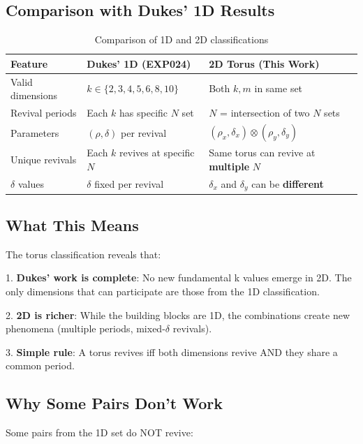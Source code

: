 \documentclass[12pt]{article}
\begin{document}
\subsection{Comparison with Dukes' 1D Results}

\begin{table}[h!]
\centering
\caption{Comparison of 1D and 2D classifications}
\label{tab:comparison}
\begin{tabular}{p{4cm}p{5cm}p{5cm}}
\toprule
\textbf{Feature} & \textbf{Dukes' 1D (EXP024)} & \textbf{2D Torus (This Work)} \\
\midrule
Valid dimensions & \(k \in \{2,3,4,5,6,8,10\}\) & Both \(k,m\) in same set \\
Revival periods & Each \(k\) has specific \(N\) set & \(N\) = intersection of two \(N\) sets \\
Parameters & \((\rho, \delta)\) per revival & \((\rho_x,\delta_x) \otimes (\rho_y,\delta_y)\) \\
Unique revivals & Each \(k\) revives at specific \(N\) & Same torus can revive at \textbf{multiple} \(N\) \\
\(\delta\) values & \(\delta\) fixed per revival & \(\delta_x\) and \(\delta_y\) can be \textbf{different} \\
\bottomrule
\end{tabular}
\end{table}

\subsection{What This Means}

The torus classification reveals that:

1. \textbf{Dukes' work is complete}: No new fundamental k values emerge in 2D. The only dimensions that can participate are those from the 1D classification.

2. \textbf{2D is richer}: While the building blocks are 1D, the combinations create new phenomena (multiple periods, mixed-\(\delta\) revivals).

3. \textbf{Simple rule}: A torus revives iff both dimensions revive AND they share a common period.

\subsection{Why Some Pairs Don't Work}

Some pairs from the 1D set do NOT revive:
\end{document}
